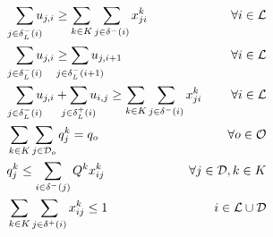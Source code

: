 \documentclass{article}
\begin{document}
\begin{alignat}{3}
    \label{mod:c230}       & \hspace{2mm} \smashoperator{ \sum_{ j \in \delta^{-}_{L}(i)}}{u_{j,i } }  \geq \sum_{k \in K}\sum_{j \in  \delta^{-}(i) }{x^k_{ji}}                                                                                                                                                    & \hspace{-20mm} \forall i \in \mathcal{L}                                                         \\
    \label{mod:c231}       & \hspace{2mm} \smashoperator{ \sum_{ j \in \delta^{-}_{L}(i)}}{u_{j,i } } \geq \smashoperator{ \sum_{ j \in \delta^{-}_{L}(i+1)}}{u_{j,i+1 } }                                                                                                                                          & \hspace{-20mm} \forall i \in \mathcal{L}                                                         \\
    \label{mod:c23}        & \hspace{2mm} \smashoperator{ \sum_{ j \in \delta^{-}_{L}(i)}}{u_{j,i } } + \smashoperator{ \sum_{ j \in \delta^{+}_{L}(i)}}{u_{i,j } } \geq \sum_{k \in K}\sum_{j \in  \delta^{-}(i) }{x^k_{ji}}                                                                                       & \hspace{-20mm} \forall i \in \mathcal{L}                                                         \\
    \label{mod:c24}        & \sum_{k \in K}\sum_{j \in \mathcal{D}_o}{q^k_j} = q_o                                                                                                                                                                                                                                  & \hspace{-20mm}  \forall o \in \mathcal{O}                                                        \\
    \label{mod:c240}       & q^k_j \leq \sum_{i \in  \delta^{-}(j)}{Q^k x^k_{ij}}                                                                                                                                                                                                                                   & \hspace{-20mm}  \forall j \in \mathcal{D}, k \in K                                               \\
    \label{mod:c25}        & \sum_{k \in K}\sum_{j \in \delta^{+}(i)}{x^{k}_{ij} \leq 1}                                                                                                                                                                                                                            & i \in \mathcal{L} \cup \mathcal{D}                                                               \\

\end{alignat}
\end{document}

